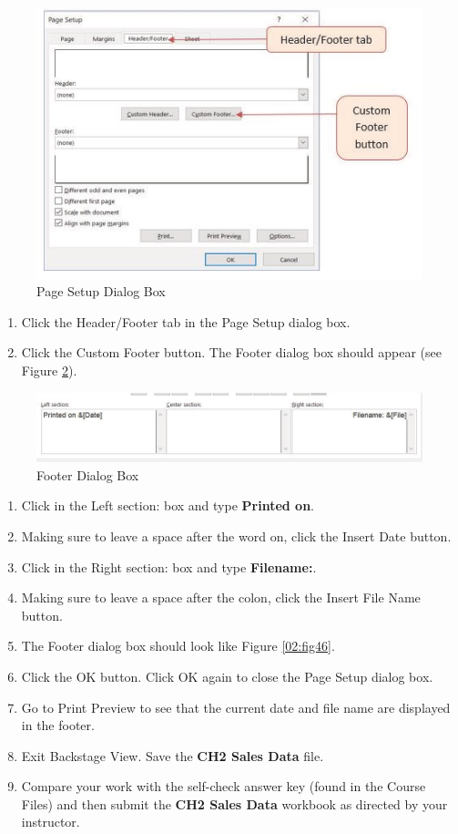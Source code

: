 \begin{figure}[H]
	\centering
	\includegraphics[width=\maxwidth{.95\linewidth}]{gfx/ch02_fig44}
	\caption{Page Setup Dialog Box}
	\label{02:fig44}
\end{figure}

\begin{enumerate}[resume]
	\item Click the Header/Footer tab in the Page Setup dialog box.
	\item Click the Custom Footer button. The Footer dialog box should appear (see Figure \ref{02:fig45}).
\end{enumerate}

\begin{figure}[H]
	\centering
	\includegraphics[width=\maxwidth{.95\linewidth}]{gfx/ch02_fig45}
	\caption{Footer Dialog Box}
	\label{02:fig45}
\end{figure}


\begin{enumerate}
	\item Click in the Left section: box and type \textbf{Printed on}.
	\item Making sure to leave a space after the word on, click the Insert Date button.
	\item Click in the Right section: box and type \textbf{Filename:}.
	\item Making sure to leave a space after the colon, click the Insert File Name button.
	\item The Footer dialog box should look like Figure \ref{02:fig46}.
	\item Click the OK button. Click OK again to close the Page Setup dialog box.
	\item Go to Print Preview to see that the current date and file name are displayed in the footer.
	\item Exit Backstage View. Save the \textbf{CH2 Sales Data} file.
	\item Compare your work with the self-check answer key (found in the Course Files) and then submit the \textbf{CH2 Sales Data} workbook as directed by your instructor.
\end{enumerate}

